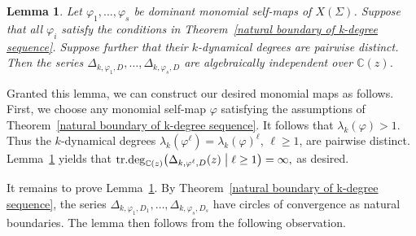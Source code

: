 \documentclass[11pt,a4paper]{article}
\theoremstyle{plain}
\newtheorem{lemma}[theorem]{Lemma}
\theoremstyle{remark}
\theoremstyle{custombold}
\newcommand{\irm}{\mathrm{i}}
\begin{document}
\begin{lemma}\label{Lemma: algebraically independent of delta}
     Let $\varphi_1,\ldots,\varphi_s$ be dominant monomial self-maps of $X(\Sigma)$. Suppose that all $\varphi_i$ satisfy the conditions in Theorem~\ref{natural boundary of k-degree sequence}. Suppose further that their $k$-dynamical degrees are pairwise distinct. Then the series $\Delta_{k,\varphi_1,D},\ldots,\Delta_{k,\varphi_s,D}$ are algebraically independent over $\mathbb C(z)$.  
\end{lemma}


Granted this lemma, we can construct our desired monomial maps as follows. First, we choose any monomial self-map $\varphi$ satisfying the assumptions of Theorem~\ref{natural boundary of k-degree sequence}. It follows that $\lambda_k(\varphi)>1$. Thus the $k$-dynamical degrees $\lambda_k(\varphi^\ell)=\lambda_k(\varphi)^\ell$, $\ell\geq1$, are pairwise distinct. Lemma~\ref{Lemma: algebraically independent of delta} yields that 
$\mathrm{tr.deg}_{\mathbb{C}(z)} \bigl(\Delta_{k,\varphi^\ell,D}(z) \bigm| \ell \geq 1\bigr) = \infty,$
as desired.

It remains to prove Lemma~\ref{Lemma: algebraically independent of delta}. By Theorem~\ref{natural boundary of k-degree sequence}, the series $\Delta_{k,\varphi_1,D_1},\ldots,\Delta_{k,\varphi_s,D_s}$ have circles of convergence as natural boundaries. The lemma then follows from the following observation.
\end{document}
